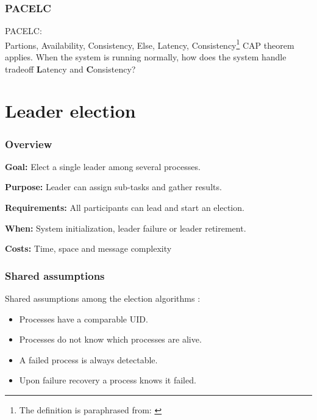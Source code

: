 \documentclass[10pt]{beamer}
\begin{document}
\begin{frame}
  \frametitle{PACELC}
  \begin{alertblock}{PACELC:\\Partions, Availability, Consistency, Else, Latency, Consistency\footnote{The definition is paraphrased from: \cite{pedersenConsistencyDistributedPervasive2022}}}
    CAP theorem applies. When the system is running normally, how does the system handle tradeoff \textbf{L}atency and \textbf{C}onsistency?
  \end{alertblock}
\end{frame}

\section{Leader election}

\begin{frame}
  \frametitle{Overview}
  \textbf{Goal:} Elect a single leader among several processes.

  \textbf{Purpose:} Leader can assign sub-tasks and gather results.

  \textbf{Requirements:} All participants can lead and start an election.

  \textbf{When:} System initialization, leader failure or leader retirement.

  \textbf{Costs:} Time, space and message complexity
\end{frame}

\begin{frame}
  \frametitle{Shared assumptions}
  Shared assumptions among the election algorithms  \cite{pedersenLeaderElectionDistributed2022}:
  \begin{itemize}
    \item Processes have a comparable UID.
    \item Processes do not know which processes are alive.
    \item A failed process is always detectable.
    \item Upon failure recovery a process knows it failed.
  \end{itemize}
\end{frame}
\end{document}
